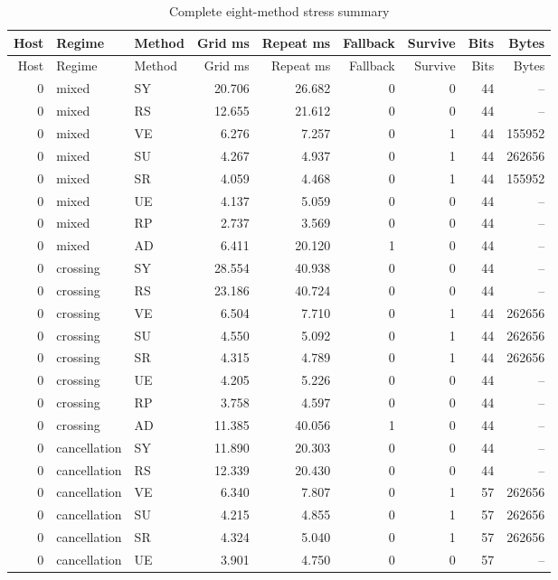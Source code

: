 \begingroup\small\setlength{\tabcolsep}{3pt}
\begin{longtable}{rllrrrrrr}
\caption{Complete eight-method stress summary}\label{tab:stress61}\\
\hline
Host & Regime & Method & Grid ms & Repeat ms & Fallback & Survive & Bits & Bytes \\
\hline\endfirsthead
\hline
Host & Regime & Method & Grid ms & Repeat ms & Fallback & Survive & Bits & Bytes \\
\hline\endhead
0 & mixed & SY & 20.706 & 26.682 & 0 & 0 & 44 & -- \\
0 & mixed & RS & 12.655 & 21.612 & 0 & 0 & 44 & -- \\
0 & mixed & VE & 6.276 & 7.257 & 0 & 1 & 44 & 155952 \\
0 & mixed & SU & 4.267 & 4.937 & 0 & 1 & 44 & 262656 \\
0 & mixed & SR & 4.059 & 4.468 & 0 & 1 & 44 & 155952 \\
0 & mixed & UE & 4.137 & 5.059 & 0 & 0 & 44 & -- \\
0 & mixed & RP & 2.737 & 3.569 & 0 & 0 & 44 & -- \\
0 & mixed & AD & 6.411 & 20.120 & 1 & 0 & 44 & -- \\
0 & crossing & SY & 28.554 & 40.938 & 0 & 0 & 44 & -- \\
0 & crossing & RS & 23.186 & 40.724 & 0 & 0 & 44 & -- \\
0 & crossing & VE & 6.504 & 7.710 & 0 & 1 & 44 & 262656 \\
0 & crossing & SU & 4.550 & 5.092 & 0 & 1 & 44 & 262656 \\
0 & crossing & SR & 4.315 & 4.789 & 0 & 1 & 44 & 262656 \\
0 & crossing & UE & 4.205 & 5.226 & 0 & 0 & 44 & -- \\
0 & crossing & RP & 3.758 & 4.597 & 0 & 0 & 44 & -- \\
0 & crossing & AD & 11.385 & 40.056 & 1 & 0 & 44 & -- \\
0 & cancellation & SY & 11.890 & 20.303 & 0 & 0 & 44 & -- \\
0 & cancellation & RS & 12.339 & 20.430 & 0 & 0 & 44 & -- \\
0 & cancellation & VE & 6.340 & 7.807 & 0 & 1 & 57 & 262656 \\
0 & cancellation & SU & 4.215 & 4.855 & 0 & 1 & 57 & 262656 \\
0 & cancellation & SR & 4.324 & 5.040 & 0 & 1 & 57 & 262656 \\
0 & cancellation & UE & 3.901 & 4.750 & 0 & 0 & 57 & -- \\

\end{longtable}
